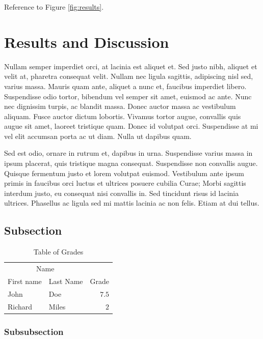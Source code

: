 \documentclass[fleqn,10pt]{JLA_article} %
\begin{document}
Reference to Figure \ref{fig:results}.

\hypertarget{results-and-discussion}{%
\section{Results and Discussion}\label{results-and-discussion}}

Nullam semper imperdiet orci, at lacinia est aliquet et. Sed justo nibh, aliquet et velit at, pharetra consequat velit. Nullam nec ligula sagittis, adipiscing nisl sed, varius massa. Mauris quam ante, aliquet a nunc et, faucibus imperdiet libero. Suspendisse odio tortor, bibendum vel semper sit amet, euismod ac ante. Nunc nec dignissim turpis, ac blandit massa. Donec auctor massa ac vestibulum aliquam. Fusce auctor dictum lobortis. Vivamus tortor augue, convallis quis augue sit amet, laoreet tristique quam. Donec id volutpat orci. Suspendisse at mi vel elit accumsan porta ac ut diam. Nulla ut dapibus quam.

Sed est odio, ornare in rutrum et, dapibus in urna. Suspendisse varius massa in ipsum placerat, quis tristique magna consequat. Suspendisse non convallis augue. Quisque fermentum justo et lorem volutpat euismod. Vestibulum ante ipsum primis in faucibus orci luctus et ultrices posuere cubilia Curae; Morbi sagittis interdum justo, eu consequat nisi convallis in. Sed tincidunt risus id lacinia ultrices. Phasellus ac ligula sed mi mattis lacinia ac non felis. Etiam at dui tellus.

\hypertarget{subsection-2}{%
\subsection{Subsection}\label{subsection-2}}

\begin{table}[hbt]
\caption{Table of Grades}
\centering
\begin{tabular}{llr}
\toprule
\multicolumn{2}{c}{Name} \\
\cmidrule(r){1-2}
First name & Last Name & Grade \\
\midrule
John & Doe & $7.5$ \\
Richard & Miles & $2$ \\
\bottomrule
\end{tabular}
\label{tab:label}
\end{table}

\hypertarget{subsubsection}{%
\subsubsection{Subsubsection}\label{subsubsection}}
\end{document}
